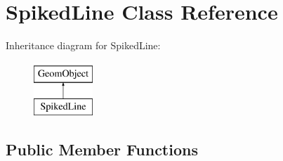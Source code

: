 \hypertarget{classSpikedLine}{}\section{Spiked\+Line Class Reference}
\label{classSpikedLine}
Inheritance diagram for Spiked\+Line\+:\begin{figure}[H]
\begin{center}
\leavevmode
\includegraphics[height=2.000000cm]{classSpikedLine}
\end{center}
\end{figure}
\subsection*{Public Member Functions}
